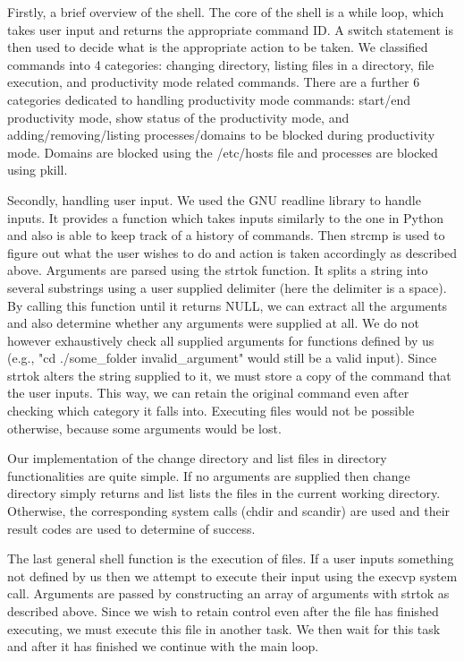 \documentclass{article}
\begin{document}
Firstly, a brief overview of the shell. The core of the shell is a while loop, which takes user input and returns the appropriate command ID. A switch statement is then used to decide what is the appropriate action to be taken. We classified commands into 4 categories: changing directory, listing files in a directory, file execution, and productivity mode related commands. There are a further 6 categories dedicated to handling productivity mode commands: start/end productivity mode, show status of the productivity mode, and adding/removing/listing processes/domains to be blocked during productivity mode. Domains are blocked using the /etc/hosts file and processes are blocked using pkill.

Secondly, handling user input. We used the GNU readline library to handle inputs. It provides a function which takes inputs similarly to the one in Python and also is able to keep track of a history of commands.  Then strcmp is used to figure out what the user wishes to do and action is taken accordingly as described above. Arguments are parsed using the strtok function. It splits a string into several substrings using a user supplied delimiter (here the delimiter is a space). By calling this function until it returns NULL, we can extract all the arguments and also determine whether any arguments were supplied at all. We do not however exhaustively check all supplied arguments for functions defined by us (e.g., "cd ./some\_folder invalid\_argument" would still be a valid input). Since strtok alters the string supplied to it, we must store a copy of the command that the user inputs. This way, we can retain the original command even after checking which category it falls into. Executing files would not be possible otherwise, because some arguments would be lost.

Our implementation of the change directory and list files in directory functionalities are quite simple. If no arguments are supplied then change directory simply returns and list lists the files in the current working directory. Otherwise, the corresponding system calls (chdir and scandir) are used and their result codes are used to determine of success.

The last general shell function is the execution of files. If a user inputs something not defined by us then we attempt to execute their input using the execvp system call. Arguments are passed by constructing an array of arguments with strtok as described above. Since we wish to retain control even after the file has finished executing, we must execute this file in another task. We then wait for this task and after it has finished we continue with the main loop.
\end{document}
